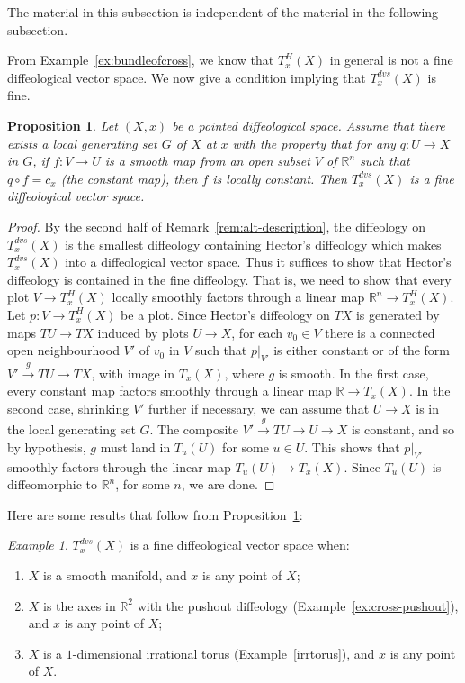 \documentclass[12pt]{amsart}
\newtheorem{prop}[de]{Proposition}
\theoremstyle{remark}
\newtheorem{ex}[de]{Example}
\newcommand{\ra}{\to}
\newcommand{\lra}{\longrightarrow}
\newcommand{\llra}[1]{\stackrel{#1}{\lra}}  %
\def \R{\mathbb{R}}
\begin{document}
The material in this subsection is independent of the material in
the following subsection.

\medskip

From Example~\ref{ex:bundleofcross},
we know that $T^H_x(X)$ in general is not a fine diffeological vector space.
We now give a condition implying that $T^{dvs}_x(X)$ is fine.

\begin{prop}\label{prop:fine}
Let $(X,x)$ be a pointed diffeological space.
Assume that there exists a local generating set $G$ of $X$ at $x$ with the property
that for any $q:U \ra X$ in $G$,
if $f : V \to U$ is a smooth map from an open subset $V$ of $\R^n$ such that
$q \circ f = c_x$ (the constant map), then $f$ is locally constant.
Then $T_x^{dvs}(X)$ is a fine diffeological vector space.
\end{prop}

\begin{proof}
By the second half of Remark~\ref{rem:alt-description}, the
diffeology on $T^{dvs}_x(X)$ is the smallest diffeology containing
Hector's diffeology which makes $T^{dvs}_x(X)$ into a diffeological
vector space.
Thus it suffices to show that Hector's diffeology is contained
in the fine diffeology.
That is, we need to show that every plot $V \ra T^H_x(X)$
locally smoothly factors through a linear map $\R^n \to T^H_x(X)$.
Let $p : V \to T^H_x(X)$ be a plot.
Since Hector's diffeology on $TX$ is generated by maps $TU \to TX$
induced by plots $U \to X$, for each $v_0 \in V$ there is a connected
open neighbourhood $V'$ of $v_0$ in $V$ such that $p|_{V'}$ is either
constant or of the form $V' \llra{g} TU \to TX$, with image in $T_x(X)$,
where $g$ is smooth.
In the first case, every constant map factors smoothly through a
linear map $\R \to T_x(X)$.
In the second case, shrinking $V'$ further if necessary,
we can assume that $U \to X$ is in the local generating set $G$.
The composite $V' \llra{g} TU \to U \to X$ is constant, and so by hypothesis,
$g$ must land in $T_{u}(U)$ for some $u \in U$.
This shows that $p|_{V'}$ smoothly factors through the linear map $T_u(U) \to T_x(X)$.
Since $T_u(U)$ is diffeomorphic to $\R^n$, for some $n$, we are done.
\end{proof}


Here are some results that follow from Proposition~\ref{prop:fine}:

\begin{ex}\label{ex:fineexamples}
$T_x^{dvs}(X)$ is a fine diffeological vector space when:
\begin{enumerate}
\item $X$ is a smooth manifold, and $x$ is any point of $X$;
\item $X$ is the axes in $\R^2$ with the pushout diffeology (Example~\ref{ex:cross-pushout}),
and $x$ is any point of $X$;
\item\label{tangentirrtorus} $X$ is a $1$-dimensional irrational torus (Example~\ref{irrtorus}),
and $x$ is any point of $X$.
\end{enumerate}
\end{ex}
\end{document}
